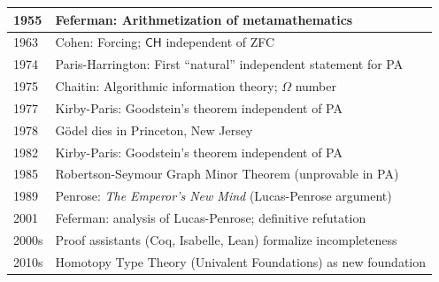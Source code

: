 \begin{tabularx}{\linewidth}{|l|X|}
1955 & Feferman: Arithmetization of metamathematics \\ \hline
1963 & Cohen: Forcing; $\mathsf{CH}$ independent of ZFC \\ \hline
1974 & Paris-Harrington: First ``natural'' independent statement for PA \\ \hline
1975 & Chaitin: Algorithmic information theory; $\Omega$ number \\ \hline
1977 & Kirby-Paris: Goodstein's theorem independent of PA \\ \hline
1978 & Gödel dies in Princeton, New Jersey \\ \hline
1982 & Kirby-Paris: Goodstein's theorem independent of PA \\ \hline
1985 & Robertson-Seymour Graph Minor Theorem (unprovable in PA) \\ \hline
1989 & Penrose: \emph{The Emperor's New Mind} (Lucas-Penrose argument) \\ \hline
2001 & Feferman: analysis of Lucas-Penrose; definitive refutation \\ \hline
2000s & Proof assistants (Coq, Isabelle, Lean) formalize incompleteness \\ \hline
2010s & Homotopy Type Theory (Univalent Foundations) as new foundation \\ \hline
\end{tabularx}


